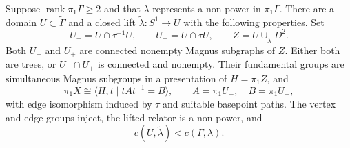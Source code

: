 \begin{lemma}\label{mag:splitting}
Suppose $\operatorname{rank}\pi_1\Gamma\geq2$ and that $\lambda$
represents a non-power in $\pi_1\Gamma$.
There are a domain $U\subset\widetilde\Gamma$ and a closed lift
$\widetilde\lambda\colon S^1\to U$ with the following properties.
Set
\[
 U_-=U\cap\tau^{-1}U,\qquad U_+=U\cap\tau U,
 \qquad Z=U\cup_{\widetilde\lambda}D^2.
\]
Both $U_-$ and $U_+$ are connected nonempty Magnus subgraphs of
$Z$.  Either both are trees, or $U_-\cap U_+$ is connected and
nonempty.  Their fundamental groups are simultaneous Magnus
subgroups in a presentation of $H=\pi_1Z$, and
\begin{equation}\label{mag:hnn}
 \pi_1X\cong\langle H,t\mid tAt^{-1}=B\rangle,
 \qquad A=\pi_1U_-,\quad B=\pi_1U_+,
\end{equation}
with edge isomorphism induced by $\tau$ and suitable basepoint
paths.  The vertex and edge groups inject, the lifted relator is
a non-power, and
\[
 c(U,\widetilde\lambda)<c(\Gamma,\lambda).
\]
\end{lemma}

